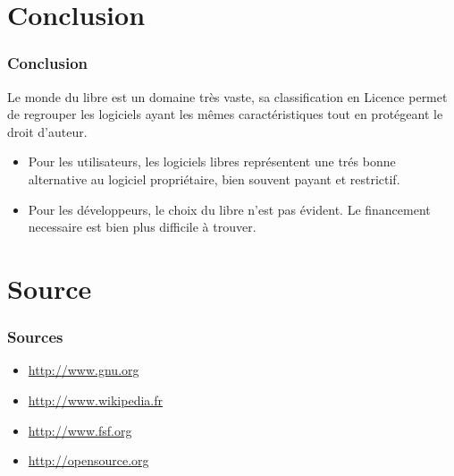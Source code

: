 \documentclass{beamer}
\begin{document}
\section[Conclusion]{Conclusion}

\begin{frame}
	\frametitle{Conclusion}
	Le monde du libre est un domaine très vaste, sa classification en Licence permet de regrouper les logiciels ayant les mêmes caractéristiques tout en protégeant le droit d'auteur.\newline
	\begin{itemize}
		\item Pour les utilisateurs, les logiciels libres représentent une trés bonne alternative au logiciel propriétaire, bien souvent payant et restrictif.\newline
		\item Pour les développeurs, le choix du libre n'est pas évident. Le financement necessaire est bien plus difficile à trouver.	
	\end{itemize}
\end{frame}

\section[Sources]{Source}

\begin{frame}
	\frametitle{Sources}
	\begin{itemize}
		\item \url{http://www.gnu.org}
		\item \url{http://www.wikipedia.fr}
		\item \url{http://www.fsf.org}
		\item \url{http://opensource.org}
	\end{itemize}
\end{frame}
\end{document}
